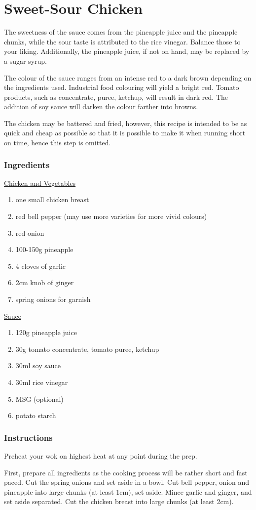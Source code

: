\documentclass[11pt]{report}
\newcommand{\header}[1]{\subsubsection*{#1}}
\newcommand{\ingredientsection}[1]{\medskip\noindent\underline{#1}\medskip}
\begin{document}
\section{Sweet-Sour Chicken}
The sweetness of the sauce comes from the pineapple juice and the pineapple
chunks, while the sour taste is attributed to the rice vinegar. Balance those
to your liking. Additionally, the pineapple juice, if not on hand, may be
replaced by a sugar syrup.

The colour of the sauce ranges from an intense red to a dark brown depending on
the ingredients used. Industrial food colouring will yield a bright red. Tomato
products, such as concentrate, puree, ketchup, will result in dark red. The
addition of soy sauce will darken the colour farther into browns.

The chicken may be battered and fried, however, this recipe is intended to be
as quick and cheap as possible so that it is possible to make it when running
short on time, hence this step is omitted.

\header{Ingredients}

\ingredientsection{Chicken and Vegetables}
\begin{enumerate}
  \item one small chicken breast
  \item red bell pepper (may use more varieties for more vivid colours)
  \item red onion
  \item 100-150g pineapple
  \item 4 cloves of garlic
  \item 2cm knob of ginger
  \item spring onions for garnish
\end{enumerate}

\ingredientsection{Sauce}
\begin{enumerate}
  \item 120g pineapple juice
  \item 30g tomato concentrate, tomato puree, ketchup
  \item 30ml soy sauce
  \item 30ml rice vinegar
  \item MSG (optional)
  \item potato starch
\end{enumerate}

\header{Instructions}
Preheat your wok on highest heat at any point during the prep.

First, prepare all ingredients as the cooking process will be rather short and
fast paced. Cut the spring onions and set aside in a bowl. Cut bell pepper,
onion and pineapple into large chunks (at least 1cm), set aside. Mince garlic
and ginger, and set aside separated. Cut the chicken breast into large chunks
(at least 2cm).
\end{document}
